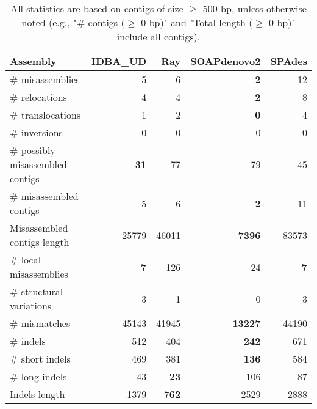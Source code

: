 \documentclass[12pt,a4paper]{article}
\begin{document}
\begin{table}[ht]
\begin{center}
\caption{All statistics are based on contigs of size $\geq$ 500 bp, unless otherwise noted (e.g., "\# contigs ($\geq$ 0 bp)" and "Total length ($\geq$ 0 bp)" include all contigs).}
\begin{tabular}{|l*{4}{|r}|}
\hline
Assembly & IDBA\_UD & Ray & SOAPdenovo2 & SPAdes \\ \hline
\# misassemblies & 5 & 6 & {\bf 2} & 12 \\ \hline
\hspace{5mm}\# relocations & 4 & 4 & {\bf 2} & 8 \\ \hline
\hspace{5mm}\# translocations & 1 & 2 & {\bf 0} & 4 \\ \hline
\hspace{5mm}\# inversions & 0 & 0 & 0 & 0 \\ \hline
\# possibly misassembled contigs & {\bf 31} & 77 & 79 & 45 \\ \hline
\# misassembled contigs & 5 & 6 & {\bf 2} & 11 \\ \hline
Misassembled contigs length & 25779 & 46011 & {\bf 7396} & 83573 \\ \hline
\# local misassemblies & {\bf 7} & 126 & 24 & {\bf 7} \\ \hline
\# structural variations & 3 & 1 & 0 & 3 \\ \hline
\# mismatches & 45143 & 41945 & {\bf 13227} & 44190 \\ \hline
\# indels & 512 & 404 & {\bf 242} & 671 \\ \hline
\hspace{5mm}\# short indels & 469 & 381 & {\bf 136} & 584 \\ \hline
\hspace{5mm}\# long indels & 43 & {\bf 23} & 106 & 87 \\ \hline
Indels length & 1379 & {\bf 762} & 2529 & 2888 \\ \hline
\end{tabular}
\end{center}
\end{table}
\end{document}

